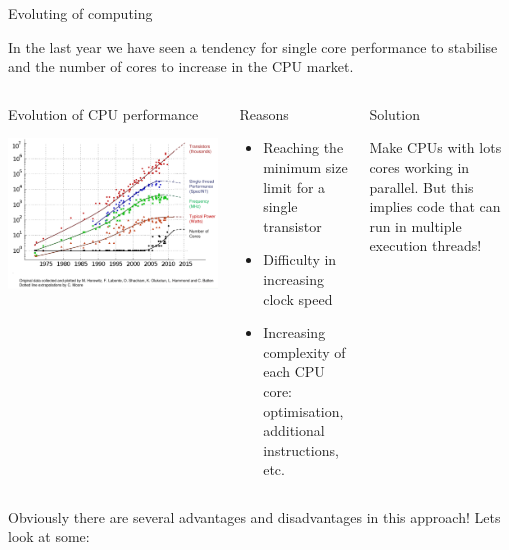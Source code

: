 \documentclass[8pt]{beamer}
\begin{document}
\begin{frame}{Evoluting of computing}
 
In the last year we have seen a tendency for single core performance to stabilise and the number of cores to increase in the CPU market. 

\begin{columns}

\begin{block}{Evolution of CPU performance}
 
\includegraphics[width=\linewidth]{img/EvolutionOfTheCPU.png}
 
\end{block}

\begin{block}{Reasons}

\begin{itemize}
  \item Reaching the minimum size limit for a single transistor
  \item Difficulty in increasing clock speed
  \item Increasing complexity of each CPU core: optimisation, additional instructions, etc.
\end{itemize}
 
\end{block}

\begin{block}{Solution}

Make CPUs with lots cores working in parallel. But this implies code that can run in multiple execution threads!

\end{block}

\end{columns}

\begin{center}
Obviously there are several advantages and disadvantages in this approach! Lets look at some:
\end{center}
 
\end{frame}
\end{document}
